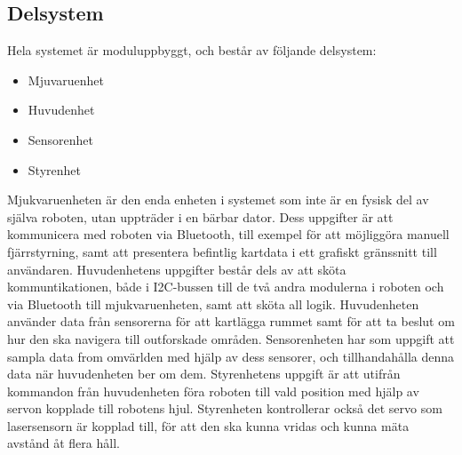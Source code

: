 \documentclass{article}
\begin{document}
\subsection{Delsystem}
Hela systemet är moduluppbyggt, och består av följande delsystem:
\begin{itemize}
\item Mjuvaruenhet
\item Huvudenhet
\item Sensorenhet
\item Styrenhet
\end{itemize}
Mjukvaruenheten är den enda enheten i systemet som inte är en fysisk del av själva roboten, utan uppträder i en bärbar dator. Dess uppgifter är att kommunicera med roboten via Bluetooth, till exempel för att möjliggöra manuell fjärrstyrning, samt att presentera befintlig kartdata i ett grafiskt gränssnitt till användaren.  
\newline\newline
Huvudenhetens uppgifter består dels av att sköta kommuntikationen, både i I2C-bussen till de två andra modulerna i roboten och via Bluetooth till mjukvaruenheten, samt att sköta all logik. Huvudenheten använder data från sensorerna för att kartlägga rummet samt för att ta beslut om hur den ska navigera till outforskade områden.
\newline\newline
Sensorenheten har som uppgift att sampla data from omvärlden med hjälp av dess sensorer, och tillhandahålla denna data när huvudenheten ber om dem.
Styrenhetens uppgift är att utifrån kommandon från huvudenheten föra roboten till vald position med hjälp av servon kopplade till robotens hjul. Styrenheten kontrollerar också det servo som lasersensorn är kopplad till, för att den ska kunna vridas och kunna mäta avstånd åt flera håll. 
\end{document}
